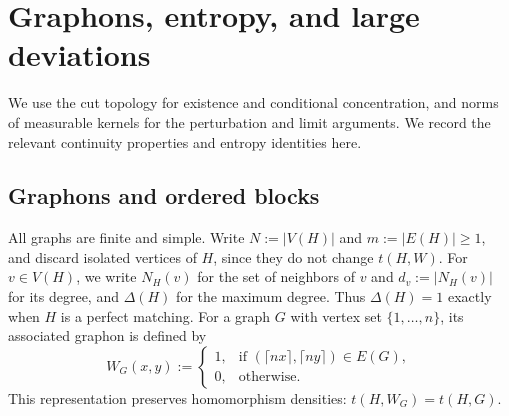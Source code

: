 \section{Graphons, entropy, and large deviations}\label{sec:graphons-entropy}

We use the cut topology for existence and conditional concentration,
and norms of measurable kernels for the perturbation and limit
arguments. We record the relevant continuity properties and entropy
identities here.

\subsection{Graphons and ordered blocks}\label{sec:graphons}

All graphs are finite and simple.  Write $N:=|V(H)|$ and $m:=|E(H)|\ge1$,
and discard isolated vertices of $H$, since they do not change $t(H,W)$.
For $v\in V(H)$,
we write $N_H(v)$ for the set of neighbors of $v$ and $d_v:=|N_H(v)|$ for its
degree, and $\Delta(H)$ for the maximum degree.
Thus $\Delta(H)=1$ exactly when $H$ is a perfect matching.
For a graph $G$ with vertex set $\{1,\ldots,n\}$,
its associated graphon is defined by
\[
  W_G(x,y):=
  \begin{cases}
    1,&\text{if }(\lceil nx\rceil,\lceil ny\rceil)\in E(G),\\
    0,&\text{otherwise}.
  \end{cases}
\]
This representation preserves homomorphism densities:
$t(H,W_G)=t(H,G)$.

